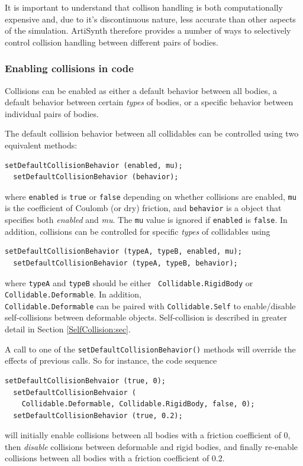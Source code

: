 It is important to understand that collison handling is both
computationally expensive and, due to it's discontinuous nature, less
accurate than other aspects of the simulation.  ArtiSynth therefore
provides a number of ways to selectively control collision handling
between different pairs of bodies.


\subsubsection{Enabling collisions in code}

Collisions can be enabled as either a default behavior between all
bodies, a default behavior between certain {\it types} of
bodies, or a specific behavior between individual pairs of bodies.

The default collision behavior between all collidables can be
controlled using two equivalent methods:
%
\begin{lstlisting}[]
  setDefaultCollisionBehavior (enabled, mu);
  setDefaultCollisionBehavior (behavior);
\end{lstlisting}
%
where {\tt enabled} is {\tt true} or {\tt false} depending on whether
collisions are enabled, {\tt mu} is the coefficient of Coulomb (or
dry) friction, and {\tt behavior} is a
 object that
specifies both {\it enabled} and {\it mu}. The {\tt mu} value is
ignored if {\tt enabled} is {\tt false}.  In addition, collisions can
be controlled for specific {\it types} of collidables using
%
\begin{lstlisting}[]
  setDefaultCollisionBehavior (typeA, typeB, enabled, mu);
  setDefaultCollisionBehavior (typeA, typeB, behavior);
\end{lstlisting}
%
where {\tt typeA} and {\tt typeB} should be either {\tt
Collidable.RigidBody} or {\tt Collidable.Deformable}.  In addition,\\
{\tt Collidable.Deformable} can be paired with {\tt Collidable.Self} to
enable/disable self-collisions between deformable objects.
Self-collision is described in greater detail in Section
\ref{SelfCollision:sec}.

A call to one of the {\tt setDefaultCollisionBehavior()} methods will
override the effects of previous calls. So for instance, the code
sequence
%
\begin{lstlisting}[]
  setDefaultCollisionBehvaior (true, 0);
  setDefaultCollisionBehvaior (
    Collidable.Deformable, Collidable.RigidBody, false, 0);
  setDefaultCollisionBehavior (true, 0.2);
\end{lstlisting}
%
will initially enable collisions between all bodies with a friction
coefficient of 0, then {\it disable} collisions between deformable and
rigid bodies, and finally re-enable collisions between all bodies with
a friction coefficient of 0.2.

